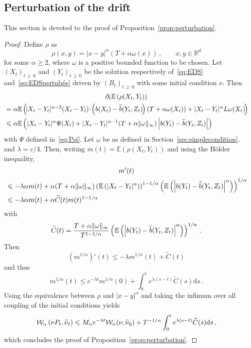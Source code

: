 \documentclass[10pt]{amsart}
\theoremstyle{definition}\newtheorem{defi}[theo]{Definition}\newtheorem{rema}[theo]{Remark}\newtheorem{exam}[theo]{Example}\newtheorem{exem}[theo]{Example}\newtheorem{nota}[theo]{Notation}
\newcommand{\R}{\mathbb R}
\newcommand{\bbE}{\mathbb E}
\newcommand{\clW}{\mathcal W}
\newcommand{\dd}{\mathrm{d}}
\newcommand{\1}{\mathbbm{1}}
\newcommand{\nv}[1]{#1}
\let\oldtilde\tilde
\renewcommand*{\tilde}[1]{\mathchoice{\widetilde{#1}}{\widetilde{#1}}{\oldtilde{#1}}{\oldtilde{#1}}}
\begin{document}
\subsection{\nv{Perturbation} of the drift}\label{sec:perturbation}

This section is devoted to the proof of Proposition~\ref{prop:perturbation}.
\begin{proof}
Define $\rho$ as
\[
\rho(x,y) = |x-y|^\alpha \left( T+ \alpha \nv{\omega}(x)\right)\,,\qquad x,y\in\R^d
\]
for some $\alpha\geqslant 2$, where $\nv{\omega}$ is a positive bounded function to be chosen. Let $(X_t)_{t\,\geqslant\,0}$ and $(Y_t)_{t\,\geqslant \,0}$ be the solution respectively of~\eqref{eq:EDS} and~\eqref{eq:EDSpertubée} driven by $(B_t)_{t\,\geqslant\,0}$ with some initial condition $\nu$. Then
\begin{multline*}
\partial_t \bbE \left( \rho(X_t,Y_t) \right)\\
\begin{aligned}
& = \alpha \bbE\left(\!|X_t-Y_t|^{\alpha-2} (X_t-Y_t)\!\cdot\! \left( b(X_t) - \tilde b(Y_t,Z_t)\! \right) (T+\alpha \nv{\omega}(X_t)) + |X_t-Y_t|^\alpha L\nv{\omega}(X_t)\!\right) \\
& \leqslant \alpha \bbE \left( |X_t-Y_t|^\alpha \Psi(X_t) + |X_t-Y_t|^{\alpha-1}(T+\alpha\|\nv{\omega}\|_\infty) \left| b(Y_t) - \tilde b(Y_t,Z_t)\right|\right)
\end{aligned}
\end{multline*}
with $\Psi$ defined in~\eqref{eq:Psi}. Let $\nv{\omega}$ be as defined in Section~\ref{sec:simplecondition}, and $\lambda=c/4$. Then, writing $m(t)=\bbE \left( \rho(X_t,Y_t) \right)$ and using the Hölder inequality,
\begin{multline*}
m'(t)\\
\begin{aligned}
& \leqslant -\lambda \alpha m(t) + \alpha (T+\alpha\|\nv{\omega}\|_\infty) \left( \bbE \left( |X_t-Y_t|^{\alpha} \right) \right)^{1-1/\alpha}\left( \bbE \left(\left| b(Y_t) - \tilde b(Y_t,Z_t)\right|^\alpha\right)\right)^{1/\alpha} \\
& \leqslant -\lambda \alpha m(t) + \alpha \widetilde C(t) m(t)^{1-1/\alpha}
\end{aligned}
\end{multline*}
with
\[
\widetilde C(t) = \frac{T+\alpha\|\nv{\omega}\|_\infty}{T^{1-1/\alpha}} \left( \bbE \left(\left| b(Y_t) - \tilde b(Y_t,Z_t)\right|^\alpha\right)\right)^{1/\alpha}\,.
\]
Then
\[
\left(m^{1/\alpha}\right)'(t) \leqslant -\lambda m^{1/\alpha}(t) + \widetilde C(t)
\]
and thus
\[
m^{1/\alpha}(t) \leqslant e^{-\lambda t}m^{1/\alpha}(0) + \int_0^t e^{\lambda (s-t)}\widetilde C(s)\dd s\,.
\]
Using the equivalence between $\rho$ and $|x-y|^\alpha$ and taking the infimum over all coupling of the initial conditions yields
\[
\clW_\alpha\left(\nu P_t,\tilde \nu_t\right) \leqslant M_\alpha e^{-\lambda t} \clW_\alpha(\nu,\tilde \nu_0)+ T^{-1/\alpha} \int_0^t e^{\lambda (s-t)}\widetilde C(s)\dd s\,,
\]
which concludes the proof of Proposition~\ref{prop:perturbation}.
\end{proof}
\end{document}
